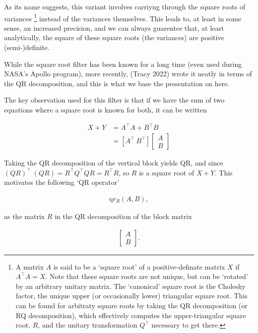 \documentclass[
]{report}
\theoremstyle{plain}
\theoremstyle{plain}
\theoremstyle{plain}
\theoremstyle{remark}
\begin{document}
As its name suggests, this variant involves carriyng through the square
roots of variances \footnote{A matrix \(A\) is said to be a `square
  root' of a positive-definate matrix \(X\) if \(A^\intercal A = X\).
  Note that these square roots are not unique, but can be `rotated' by
  an arbitrary unitary matrix. The `canonical' square root is the
  Cholesky factor, the unique upper (or occasionally lower) triangular
  square root. This can be found for arbitraty square roots by taking
  the QR decomposition (or RQ decomposition), which effectively computes
  the upper-triangular square root, \(R\), and the unitary
  transformation \(Q^\intercal\) necessary to get there.} instead of the
variances themselves. This leads to, at least in some sense, an
increased precision, and we can always guarentee that, at least
analytically, the square of these square roots (the variances) are
positive (semi-)definite.

While the square root filter has been known for a long time (even used
during NASA's Apollo program), more recently, (Tracy 2022) wrote it
neatly in terms of the QR decomposition, and this is what we base the
presentation on here.

The key observation used for this filter is that if we have the sum of
two equations where a square root is known for both, it can be written

\[\begin{split}
  X + Y &= A^\intercal A + B^\intercal B\\
  &= \left[A^\intercal\ B^\intercal\right] \left[\begin{matrix}A\\B\end{matrix}\right]
\end{split}
\]

Taking the QR decomposition of the vertical block yields QR, and since
\((QR)^\intercal\ (QR) = R^\intercal Q^\intercal Q R = R^\intercal R\),
so \(R\) is a square root of \(X+Y\). This motivates the following `QR
operator'

\[\begin{split}
\mathrm qr_R(A, B),
\end{split}
\]

as the matrix \(R\) in the QR decomposition of the block matrix

\[\begin{split}
\left[\begin{matrix}A\\B\end{matrix}\right].
\end{split}
\]
\end{document}
